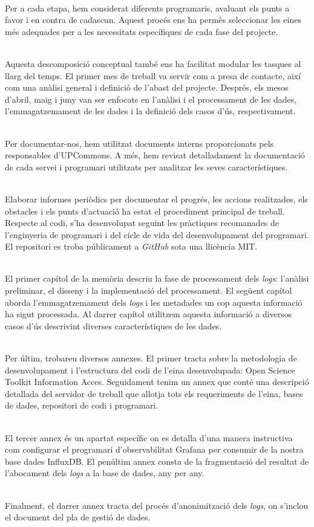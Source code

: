 \noindent \\
Per a cada etapa, hem considerat diferents programaris, avaluant els punts a favor i en contra de cadascun.
Aquest procés ens ha permès seleccionar les eines més adequades per a les necessitats específiques de cada fase del projecte.

\noindent \\
Aquesta descomposició conceptual també ens ha facilitat modular les tasques al llarg del temps.
El primer mes de treball va servir com a presa de contacte, així com una anàlisi general i definició de l'abast del projecte.
Després, els mesos d'abril, maig i juny van ser enfocats en l'anàlisi i el processament de les dades, l'emmagatzemament de les dades i la definició dels casos d'ús, respectivament.

\noindent \\
Per documentar-nos, hem utilitzat documents interns proporcionats pels responsables d'\gls{UPCommons}.
A més, hem revisat detalladament la documentació de cada servei i programari utilitzats per analitzar les seves característiques.

\noindent \\
Elaborar informes periòdics per documentar el progrés, les accions realitzades, els obstacles i els punts d'actuació ha estat el procediment principal de treball.
Respecte al codi, s'ha desenvolupat seguint les pràctiques recomanades de l'enginyeria de programari i del cicle de vida del desenvolupament del programari.
El repositori es troba públicament a \textit{\gls{GitHub}} sota una llicència MIT.

\noindent \\
El primer capítol de la memòria descriu la fase de processament dels \textit{\gls{log}s}: l'anàlisi preliminar, el disseny i la implementació del processament.
El següent capítol aborda l'emmagatzemament dels \textit{\gls{log}s} i les metadades un cop aquesta informació ha sigut processada.
Al darrer capítol utilitzem aquesta informació a diversos casos d'ús descrivint diverses característiques de les dades.

\noindent \\
Per últim, trobareu diversos annexes.
El primer tracta sobre la metodologia de desenvolupament i l'estructura del codi de l'eina desenvolupada: Open Science Toolkit Information Acces.
Seguidament tenim un annex que conté una descripció detallada del servidor de treball que allotja tots els requeriments de l'eina, bases de dades, repositori de codi i programari.

\noindent \\
El tercer annex és un apartat específic on es detalla d'una manera instructiva com configurar el programari d'observabilitat Grafana per consumir de la nostra base dades InfluxDB.
El penúltim annex consta de la fragmentació del resultat de l'abocament dels \textit{\gls{log}s} a la base de dades, any per any.

\noindent \\
Finalment, el darrer annex tracta del procés d'anonimització dels \textit{\gls{log}s}, on s'inclou el document del pla de gestió de dades.